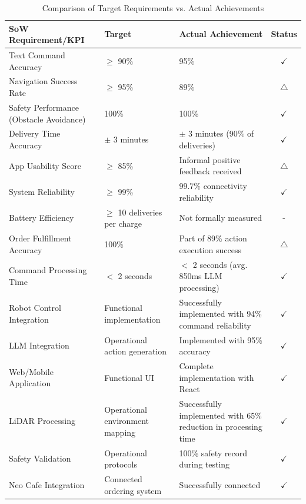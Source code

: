 \documentclass[12pt]{article}
\begin{document}
\renewcommand{\arraystretch}{1.2}
\begin{table}[H]
\centering
\begin{tabularx}{\textwidth}{|X|X|X|c|}
\hline
\textbf{SoW Requirement/KPI} & \textbf{Target} & \textbf{Actual Achievement} & \textbf{Status} \\
\hline
Text Command Accuracy & $\geq$ 90\% & 95\% & $\checkmark$ \\
\hline
Navigation Success Rate & $\geq$ 95\% & 89\% & $\triangle$ \\
\hline
Safety Performance (Obstacle Avoidance) & 100\% & 100\% & $\checkmark$ \\
\hline
Delivery Time Accuracy & $\pm$ 3 minutes & $\pm$ 3 minutes (90\% of deliveries) & $\checkmark$ \\
\hline
App Usability Score & $\geq$ 85\% & Informal positive feedback received & $\triangle$ \\
\hline
System Reliability & $\geq$ 99\% & 99.7\% connectivity reliability & $\checkmark$ \\
\hline
Battery Efficiency & $\geq$ 10 deliveries per charge & Not formally measured & - \\
\hline
Order Fulfillment Accuracy & 100\% & Part of 89\% action execution success & $\triangle$ \\
\hline
Command Processing Time & $<$ 2 seconds & $<$ 2 seconds (avg. 850ms LLM processing) & $\checkmark$ \\
\hline
Robot Control Integration & Functional implementation & Successfully implemented with 94\% command reliability & $\checkmark$ \\
\hline
LLM Integration & Operational action generation & Implemented with 95\% accuracy & $\checkmark$ \\
\hline
Web/Mobile Application & Functional UI & Complete implementation with React & $\checkmark$ \\
\hline
LiDAR Processing & Operational environment mapping & Successfully implemented with 65\% reduction in processing time & $\checkmark$ \\
\hline
Safety Validation & Operational protocols & 100\% safety record during testing & $\checkmark$ \\
\hline
Neo Cafe Integration & Connected ordering system & Successfully connected & $\checkmark$ \\
\hline
\end{tabularx}
\caption{Comparison of Target Requirements vs. Actual Achievements}
\label{tab:requirements_vs_achievements}
\end{table}
\end{document}

